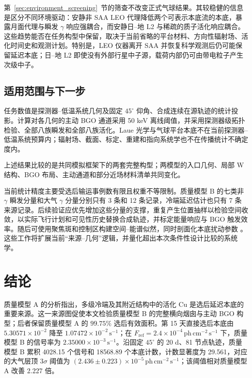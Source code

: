 \documentclass[11pt]{article}
\newcommand{\revblue}[1]{\textcolor{revisionblue}{#1}}
\newcommand{\phcms}{\,\mathrm{ph\,cm^{-2}\,s^{-1}}}
\newcommand{\cps}{\,\mathrm{s^{-1}}}
\newcommand{\fref}{F_{\mathrm{ref}}}
\begin{document}
第~\ref{sec:environment_screening}~节的筛查不改变正式气球结果。其较稳健的信息是区分不同环境驱动：安静非 SAA LEO 代理降低两个可表示本底流的本底，暴露月面代理与瞬发 $\gamma$ 响应强耦合，而安静日--地 L2 与稀疏的质子活化响应耦合。这些趋势能否在任务构型中保留，取决于当前省略的平台材料、方向性辐射场、活化时间史和观测计划。特别是，LEO 仪器离开 SAA 并恢复科学观测后仍可能保留延迟本底；日--地 L2 即使没有外部行星中子源，载荷内部仍可由带电粒子产生次级中子。

\subsection{适用范围与下一步}
\label{subsec:limitations}

任务数值是探测器--低温系统几何及固定 $45^\circ$ 仰角、合成连续在源轨迹的统计投影。计算对各几何的主动 BGO 通道采用 50 keV 离线阈值，并采用探测器级拓扑检验、全部八族瞬发和全部八族活化。Laue 光学与气球平台本底不在当前探测器--低温系统预算内；辐射场、截面、标定、重建和指向系统学也不在传播统计不确定度内。

\revblue{上述结果比较的是共同模拟框架下的两套完整构型；两模型的入口几何、局部 W 结构、BGO 布局、主动通道和部分近场材料清单共同变化。}

当前统计精度主要受选后输运事例数有限且权重不等限制。质量模型 B 的\revblue{七类非 $\gamma$ 瞬发分量}和\revblue{大气 $\gamma$ 分量}分别只有 3 条和 12 条记录，冷端延迟估计也只有 7 条来源记录。后续验证应优先增加这些分量的支撑，重复产生位置抽样以检验空间收敛，以实际飞行计划和可见性历史替换合成轨迹，并标定能量响应与 BGO 触发效率。随后可使用聚焦斑和控制区构建空间--能谱似然，同时剖面化本底扰动参数 \cite{Cowan2011}。这些工作将扩展当前“来源--几何”逻辑，并量化超出本次条件性设计比较的系统学。

\section{结论}
\label{sec:conclusions}

质量模型 A 的分析指出，多级冷端及其附近结构中的活化 Cu 是选后延迟本底的重要来源。这一来源图促使本文检验质量模型 B 的完整横向烟囱与主动 BGO 构型；后者保留质量模型 A 的 $99.75\%$ 选后有效面积。第 15 天直接选后本底由 $5.30571\times10^{-2}$ 降至 $1.07472\times10^{-2}\cps$；在 $\fref=2.4\times10^{-4}\phcms$ 下，质量模型 B 的信号率为 $2.35000\times10^{-3}\cps$。沿固定 $45^\circ$ 的 20 d、81 节点轨迹，质量模型 B 累积 4028.15 个信号和 18568.89 个本底计数，计数显著度为 29.561，对应的大气层顶 $3\sigma$ 阈值为 $(2.436\pm0.223)\times10^{-5}\phcms$；该阈值相对质量模型 A 改善 2.227 倍。
\end{document}
